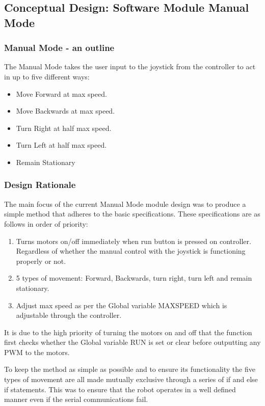 \documentclass{article}
\begin{document}
	\subsection{Conceptual Design: Software Module Manual Mode}
	
	\subsubsection{Manual Mode - an outline}
	The Manual Mode takes the user input to the joystick from the controller to act in up to five different ways:
	
	\begin{itemize}
		\item Move Forward at max speed.
		\item Move Backwards at max speed.
		\item Turn Right at half max speed.
		\item Turn Left at half max speed.
		\item Remain Stationary
	\end{itemize} 
	
	
	\subsubsection{Design Rationale}
	The main focus of the current Manual Mode module design was to produce a simple method that adheres to the basic specifications. These specifications are as follows in order of priority:
	
	\begin{enumerate}
		\item Turns motors on/off immediately when run button is pressed on controller. Regardless of whether the manual control with the joystick is functioning properly or not.
		\item 5 types of movement: Forward, Backwards, turn right, turn left and remain stationary.
		\item Adjust max speed as per the Global variable MAX\textunderscore SPEED which is adjustable through the controller.  	
	\end{enumerate} 
	
	It is due to the high priority of turning the motors on and off that the function first checks whether the Global variable RUN is set or clear before outputting any PWM to the motors.
	
	To keep the method as simple as possible and to ensure its functionality the five types of movement are all made mutually exclusive through a series of if and else if statements. This was to ensure that the robot operates in a well defined manner even if the serial communications fail. 
	
\end{document}
